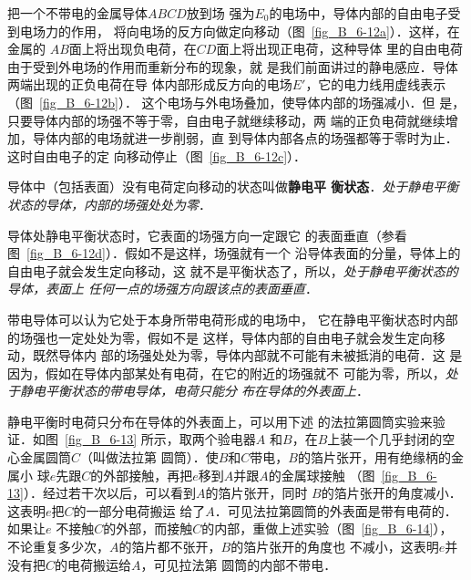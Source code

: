 把一个不带电的金属导体$ABCD$放到场
强为$E_0$的电场中，导体内部的自由电子受到电场力的作用，
将向电场的反方向做定向移动（图~\ref{fig_B_6-12a}）．这样，在金属的
$AB$面上将出现负电荷，在$CD$面上将出现正电荷，这种导体
里的自由电荷由于受到外电场的作用而重新分布的现象，就
是我们前面讲过的静电感应．导体两端出现的正负电荷在导
体内部形成反方向的电场$E'$，它的电力线用虚线表示（图~\ref{fig_B_6-12b}）．
这个电场与外电场叠加，使导体内部的场强减小．但
是，只要导体内部的场强不等于零，自由电子就继续移动，两
端的正负电荷就继续增加，导体内部的电场就进一步削弱，直
到导体内部各点的场强都等于零时为止．这时自由电子的定
向移动停止（图~\ref{fig_B_6-12c}）．

导体中（包括表面）没有电荷定向移动的状态叫做\textbf{静电平
衡状态}．\textit{处于静电平衡状态的导体，内部的场强处处为零}．

导体处静电平衡状态时，它表面的场强方向一定跟它
的表面垂直（参看图~\ref{fig_B_6-12d}）．假如不是这样，场强就有一个
沿导体表面的分量，导体上的自由电子就会发生定向移动，这
就不是平衡状态了，所以，\textit{处于静电平衡状态的导体，表面上
任何一点的场强方向跟该点的表面垂直}．

带电导体可以认为它处于本身所带电荷形成的电场中，
它在静电平衡状态时内部的场强也一定处处为零，假如不是
这样，导体内部的自由电子就会发生定向移动，既然导体内
部的场强处处为零，导体内部就不可能有未被抵消的电荷．这
是因为，假如在导体内部某处有电荷，在它的附近的场强就不
可能为零，所以，\textit{处于静电平衡状态的带电导体，电荷只能分
布在导体的外表面上}．

静电平衡时电荷只分布在导体的外表面上，可以用下述
的法拉第圆筒实验来验证．如图~\ref{fig_B_6-13} 所示，取两个验电器$A$
和$B$，在$B$上装一个几乎封闭的空心金属圆筒$C$（叫做法拉第
圆筒）．使$B$和$C$带电，$B$的箔片张开，用有绝缘柄的金属小
球$e$先跟$C$的外部接触，再把$e$移到$A$并跟$A$的金属球接触
（图~\ref{fig_B_6-13}）．经过若干次以后，可以看到$A$的箔片张开，同时
$B$的箔片张开的角度减小．这表明$e$把$C$的一部分电荷搬运
给了$A$．可见法拉第圆筒的外表面是带有电荷的．如果让$e$
不接触$C$的外部，而接触$C$的内部，重做上述实验（图~\ref{fig_B_6-14}），
不论重复多少次，$A$的箔片都不张开，$B$的箔片张开的角度也
不减小，这表明$e$并没有把$C$的电荷搬运给$A$，可见拉法第
圆筒的内部不带电．

